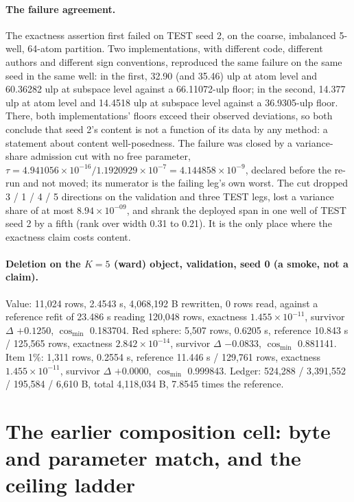 \documentclass{article} %
\newcommand{\sci}[2]{\ensuremath{#1\times10^{#2}}}
\begin{document}
\paragraph{The failure agreement.} The exactness assertion first failed on TEST seed 2, on the
coarse, imbalanced 5-well, 64-atom partition. Two implementations, with different code, different
authors and different sign conventions, reproduced the same failure on the same seed in the same
well: in the first, 32.90 (and 35.46) ulp at atom level and 60.36282 ulp at subspace level against
a 66.11072-ulp floor; in the second, 14.377 ulp at atom level and 14.4518 ulp at subspace level
against a 36.9305-ulp floor. There, both implementations' floors exceed their observed deviations,
so both conclude that seed 2's content is not a function of its data by any method: a statement
about content well-posedness. The failure was closed by a variance-share admission cut with no
free parameter, $\tau=4.941056\times10^{-16}/1.1920929\times10^{-7}=4.144858\times10^{-9}$,
declared before the re-run and not moved; its numerator is the failing leg's own worst.
The cut dropped 3 / 1 / 4 / 5 directions on the validation and three TEST legs, lost a variance
share of at most \sci{8.94}{-09}, and shrank the deployed span in one well of TEST seed 2 by a
fifth (rank over width 0.31 to 0.21). It is the only place where the exactness claim costs content.

\paragraph{Deletion on the $K=5$ (ward) object, validation, seed 0 (a smoke, not a claim).} Value:
11,024 rows, 2.4543 s, 4,068,192 B rewritten, 0 rows read, against a reference refit of 23.486 s
reading 120,048 rows, exactness \sci{1.455}{-11}, survivor $\Delta$ $+0.1250$, $\cos_{\min}$
0.183704. Red sphere: 5,507 rows, 0.6205 s, reference 10.843 s / 125,565 rows, exactness
\sci{2.842}{-14}, survivor $\Delta$ $-0.0833$, $\cos_{\min}$ 0.881141. Item 1\%: 1,311 rows,
0.2554 s, reference 11.446 s / 129,761 rows, exactness \sci{1.455}{-11}, survivor $\Delta$
$+0.0000$, $\cos_{\min}$ 0.999843. Ledger: 524,288 / 3,391,552 / 195,584 / 6,610 B, total
4,118,034 B, 7.8545 times the reference. %

\section{The earlier composition cell: byte and parameter match, and the ceiling ladder}
\label{app:w5}
\end{document}
